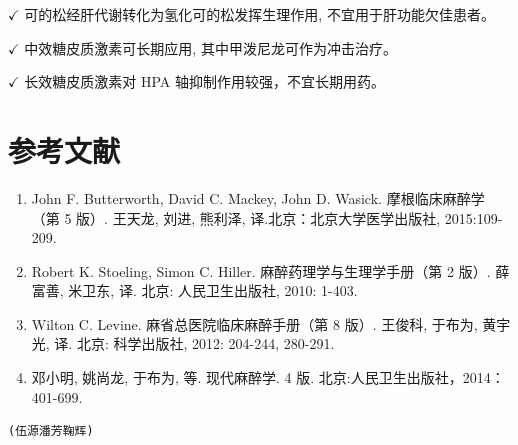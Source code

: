 \documentclass[10pt]{article}
\begin{document}
$\checkmark$ 可的松经肝代谢转化为氢化可的松发挥生理作用, 不宜用于肝功能欠佳患者。

$\checkmark$ 中效糖皮质激素可长期应用, 其中甲泼尼龙可作为冲击治疗。

$\checkmark$ 长效糖皮质激素对 HPA 轴抑制作用较强，不宜长期用药。

\section*{参考文献}
\begin{enumerate}
  \item John F. Butterworth, David C. Mackey, John D. Wasick. 摩根临床麻醉学（第 5 版）. 王天龙, 刘进, 熊利泽, 译.北京：北京大学医学出版社, 2015:109-209.

  \item Robert K. Stoeling, Simon C. Hiller. 麻醉药理学与生理学手册（第 2 版）. 薛富善, 米卫东, 译. 北京: 人民卫生出版社, 2010: 1-403.

  \item Wilton C. Levine. 麻省总医院临床麻醉手册（第 8 版）. 王俊科, 于布为, 黄宇光, 译. 北京: 科学出版社, 2012: 204-244, 280-291.

  \item 邓小明, 姚尚龙, 于布为, 等. 现代麻醉学. 4 版. 北京:人民卫生出版社，2014：401-699.

\end{enumerate}

\begin{verbatim}
(伍源潘芳鞠辉)
\end{verbatim}
\end{document}

